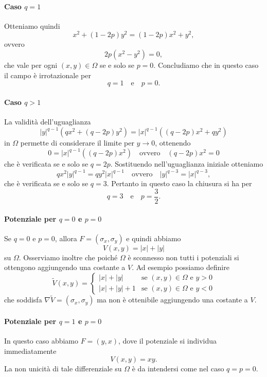 \begin{enumerate}
		\paragraph{Caso $q = 1$}
		Otteniamo quindi
		\[
		x^2 + (1 - 2p)y^2 = (1 - 2p)x^2 + y^2,
		\]
		ovvero
		\[
		2p(x^2 - y^2) = 0,
		\]
		che vale per ogni $(x,y) \in \Omega$ se e solo se $p = 0$. Concludiamo che in questo caso il campo è irrotazionale per
		\[
		q = 1 \quad \text{e} \quad p = 0.
		\]
		
		\paragraph{Caso $q > 1$}
		La validità dell'uguaglianza
		\[
		|y|^{q - 1} \left(q x^2 + (q - 2p) y^2\right) = |x|^{q - 1} \left((q - 2p) x^2 + q y^2\right)
		\]
		in $\Omega$ permette di considerare il limite per $y \to 0$, ottenendo
		\[
		0 = |x|^{q - 1} \left((q - 2p) x^2\right) \quad \text{ovvero} \quad (q - 2p)x^2 = 0
		\]
		che è verificata se e solo se $q = 2p$. Sostituendo nell'uguaglianza iniziale otteniamo
		\[
		q x^2 |y|^{q - 1} = q y^2 |x|^{q - 1} \quad \text{ovvero} \quad |y|^{q - 3} = |x|^{q - 3},
		\]
		che è verificata se e solo se $q = 3$. Pertanto in questo caso la chiusura si ha per
		\[
		q = 3 \quad \text{e} \quad p = \frac{3}{2}.
		\]
		
		\paragraph{Potenziale per $q = 0$ e $p = 0$}
		Se $q = 0$ e $p = 0$, allora $F = (\sigma_x, \sigma_y)$ e quindi abbiamo
		\[
		V(x,y) = |x| + |y|
		\]
		su $\Omega$. Osserviamo inoltre che poiché $\Omega$ è sconnesso non tutti i potenziali si ottengono aggiungendo una costante a $V$. Ad esempio possiamo definire
		\[
		\tilde{V}(x,y) =
		\begin{cases}
			|x| + |y| & \text{se } (x,y) \in \Omega \text{ e } y > 0 \\
			|x| + |y| + 1 & \text{se } (x,y) \in \Omega \text{ e } y < 0
		\end{cases}
		\]
		che soddisfa $\nabla \tilde{V} = (\sigma_x, \sigma_y)$ ma non è ottenibile aggiungendo una costante a $V$.
		
		\paragraph{Potenziale per $q = 1$ e $p = 0$}
		In questo caso abbiamo $F = (y,x)$, dove il potenziale si individua immediatamente
		\[
		V(x,y) = xy.
		\]
		La non unicità di tale differenziale su $\Omega$ è da intendersi come nel caso $q = p = 0$.
		

\end{enumerate}
